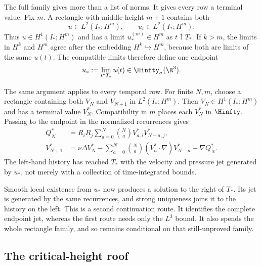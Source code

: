 The full family gives more than a list of norms.  It gives every row a terminal value.
Fix \(m\).  A rectangle with middle height \(m+1\) contains both
\[
  u\in L^2(I_*;H^m),
  \qquad
  u_t\in L^2(I_*;H^m).
\]
Thus \(u\in H^1(I_*;H^m)\) and has a limit \(u_*^{(m)}\in H^m\) as
\(t\uparrow T_*\).  If \(k>m\), the limits in \(H^k\) and \(H^m\) agree after the
embedding \(H^k\hookrightarrow H^m\), because both are limits of the same \(u(t)\).
The compatible limits therefore define one endpoint
\begin{equation}\label{eq:BodyCommonSmoothEndpoint}
  u_*:=\lim_{t\uparrow T_*}u(t)
  \in\Hinfty_\sigma(\R^3).
\end{equation}

The same argument applies to every temporal row.  For finite \(N,m\), choose a
rectangle containing both \(V_N\) and \(V_{N+1}\) in \(L^2(I_*;H^m)\).  Then
\(V_N\in H^1(I_*;H^m)\) and has a terminal value \(V_N^*\).  Compatibility in
\(m\) places each \(V_N^*\) in \(\Hinfty\).  Passing to the endpoint in the
normalized recurrences gives
\begin{align}
  Q_N^*
  &=R_iR_j\sum_{a=0}^{N}\binom{N}{a}V_{a,i}^*V_{N-a,j}^*,
  \label{eq:BodyEndpointPressureRecurrence}
  \\
  V_{N+1}^*
  &=\nu\Delta V_N^*
  -\sum_{a=0}^{N}\binom{N}{a}(V_a^*\cdot\nabla)V_{N-a}^*
  -\nabla Q_N^*.
  \label{eq:BodyEndpointVelocityRecurrence}
\end{align}
The left-hand history has reached \(T_*\) with the velocity and pressure jet generated
by \(u_*\), not merely with a collection of time-integrated bounds.

Smooth local existence from \(u_*\) now produces a solution to the right of \(T_*\).
Its jet is generated by the same recurrences, and strong uniqueness joins it to the
history on the left.  This is a second continuation route.  It identifies the complete
endpoint jet, whereas the first route needs only the \(L^3\) bound.  It also spends the
whole rectangle family, and so remains conditional on that still-unproved family.

\subsection{The critical-height roof}\label{sub:ClassicalContinuationCriteriaInsideFiniteRectangles}

